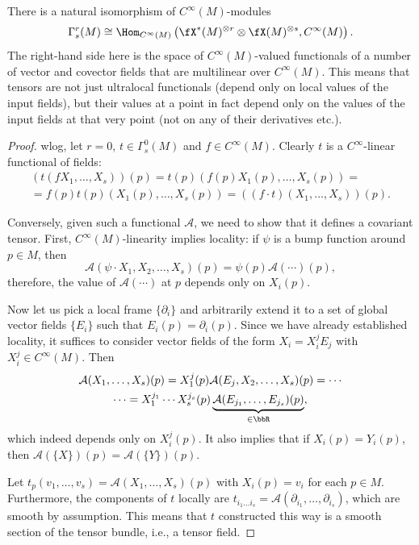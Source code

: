 \begin{thm}\label{thm tensor characterization}
    There is a natural isomorphism of $C^\infty (M)$-modules
    \[
    \Gamma^r_s(M)\cong \Hom_{C^\infty(M)}\left( \fX^\ast(M)^{\otimes r}\otimes \fX(M)^{\otimes s},C^\infty(M)\right).
    \]
    The right-hand side here is the space of $C^\infty(M)$-valued functionals of a number of vector and covector fields that are multilinear over $C^\infty(M)$. This means that tensors are not just ultralocal functionals (depend only on local values of the input fields), but their values at a point in fact depend only on the values of the input fields at that very point (not on any of their derivatives etc.).
\end{thm}
\begin{proof}
    \gls{wlog}, let $r=0$, $t\in \Gamma^0_s(M)$ and $f\in C^\infty (M)$. Clearly $t$ is a $C^\infty$-linear functional of fields:
    \begin{multline}
         (t(fX_1,\ldots,X_s))(p)=t(p)(f(p)X_1(p),\ldots,X_s(p))=\\=f(p)t(p)(X_1(p),\ldots,X_s(p))=((f\cdot t)(X_1,\ldots,X_s))(p).
    \end{multline}

    Conversely, given such a functional $\mathcal{A}$, we need to show that it defines a covariant tensor. First, $C^\infty(M)$-linearity implies locality: if $\psi$ is a bump function around $p\in M$, then \[\mathcal{A}(\psi\cdot X_1,X_2,\ldots, X_s)(p)=\psi(p)\mathcal{A}(\cdots)(p),\] therefore, the value of $\mathcal{A}(\cdots)$ at $p$ depends only on $X_i(p)$.

    Now let us pick a local frame $\{\partial_i\}$ and arbitrarily extend it to a set of global vector fields $\{E_i\}$ such that $E_i(p)=\partial_i(p)$. Since we have already established locality, it suffices to consider vector fields of the form $X_i=X^j_i E_j$ with $X^j_i\in C^\infty(M)$. Then
    \begin{multline}
        \mathcal{A}(X_1,\ldots,X_s)(p)=X^j_1(p)\mathcal{A}(E_j,X_2,\ldots,X_s)(p)=\cdots\\ \cdots=X_1^{j_1}\cdots X_s^{j_s}(p)\underbrace{\mathcal{A}(E_{j_1},\ldots,E_{j_s})(p)}_{\in\bbR },
    \end{multline}
    which indeed depends only on $X_i^j(p)$. It also implies that if $X_i(p)=Y_i(p)$, then $\mathcal{A}(\{X\})(p)=\mathcal{A}(\{Y\})(p)$.

    Let $t_p (v_1,\ldots,v_s)=\mathcal{A}(X_1,\ldots,X_s)(p)$ with $X_i(p)=v_i$ for each $p\in M$. Furthermore, the components of $t$ locally are $t_{i_1\ldots i_s}=\mathcal{A}(\partial_{i_1},\ldots,\partial_{i_s})$, which are smooth by assumption. This means that $t$ constructed this way is a smooth section of the tensor bundle, i.e., a tensor field.
\end{proof}

